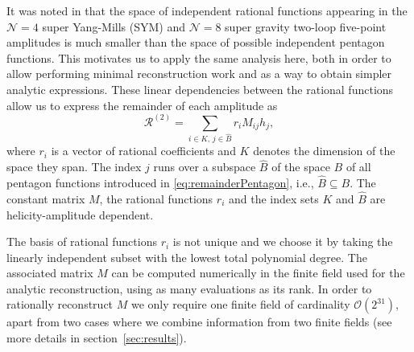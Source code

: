It was noted in \cite{Abreu:2018aqd,Chicherin:2018yne,Abreu:2019rpt,Chicherin:2019xeg} 
that the space of independent rational
functions appearing in the $\mathcal{N}=4$ super Yang-Mills (SYM) and $\mathcal{N}=8$ super gravity
two-loop five-point amplitudes is much smaller than the space of possible independent
pentagon functions. This motivates us to apply the same analysis here, both
in order to allow performing minimal reconstruction work and as a way to obtain
simpler analytic expressions.
These linear dependencies between the rational functions allow us to express the 
remainder of each amplitude as
\begin{equation}
		\mathcal{R}^{(2)} = 
		\sum_{i\in K ,\, j\in \hat B} r_i M_{ij} h_j,
\label{eq:remainderDecomposition}
\end{equation}
where $r_i$ is a vector of rational coefficients and $K$ denotes
the dimension of the space they span.
The index $j$ runs over a subspace $\hat B$ of the space $B$ of all pentagon functions 
introduced in \cref{eq:remainderPentagon}, i.e., $\hat B\subseteq B$. 
The constant matrix $M$, the rational functions $r_i$ 
and the index sets $K$ and $\hat B$ are helicity-amplitude dependent.


The basis of rational functions $r_i$ is not unique
and we choose it by taking the linearly independent subset with
the lowest total polynomial degree. The associated matrix $M$
can be computed numerically in the finite field used for the analytic reconstruction,
using as many evaluations as its rank. 
In order to rationally reconstruct $M$ we only
require one finite field of cardinality $\mathcal{O}(2^{31})$, apart from two
cases where we combine information from two finite fields (see more details in 
section~\ref{sec:results}).

